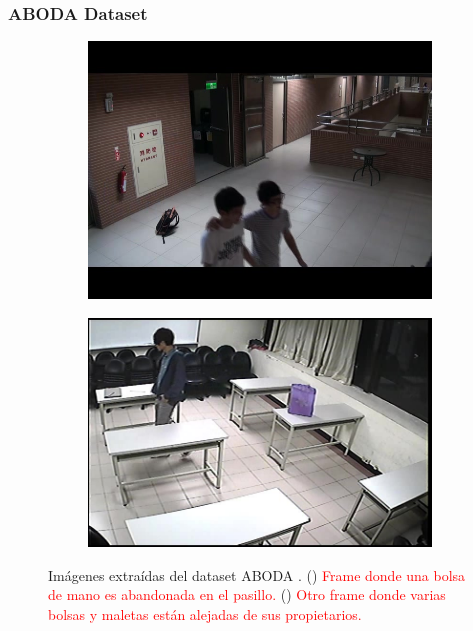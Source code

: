 \subsubsection{ABODA Dataset}

\begin{figure}[ht]
  \centering
  \begin{subfigure}[b]{0.4\textwidth}
    \includegraphics[width=\textwidth]{img/chapters/resultados/bases-datos/aboda_1.jpg}
    \caption{}
    \label{fig:aboda_1}
  \end{subfigure}
  \qquad\qquad
  \begin{subfigure}[b]{0.4\textwidth}
    \includegraphics[width=\textwidth]{img/chapters/resultados/bases-datos/aboda_2.jpg}
    \caption{}
    \label{fig:aboda_2}
  \end{subfigure}
  \caption{Imágenes extraídas del dataset ABODA \cite{aboda-dataset}.
    (\protect{}) \textcolor{red}{Frame donde una bolsa de mano es abandonada en el pasillo.}
    (\protect{}) \textcolor{red}{Otro frame donde varias bolsas y maletas están alejadas de sus propietarios.}}
  \label{fig:aboda}
\end{figure}

